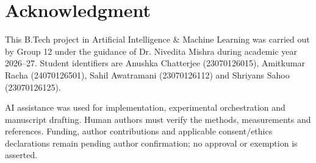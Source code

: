 \documentclass[conference,a4paper]{IEEEtran}
\begin{document}
\section*{Acknowledgment}
This B.Tech project in Artificial Intelligence \& Machine Learning was carried out by Group 12 under the guidance of Dr. Nivedita Mishra during academic year 2026--27. Student identifiers are Anushka Chatterjee (23070126015), Amitkumar Racha (24070126501), Sahil Awatramani (23070126112) and Shriyans Sahoo (23070126125).

AI assistance was used for implementation, experimental orchestration and manuscript drafting. Human authors must verify the methods, measurements and references. Funding, author contributions and applicable consent/ethics declarations remain pending author confirmation; no approval or exemption is asserted.
\end{document}
